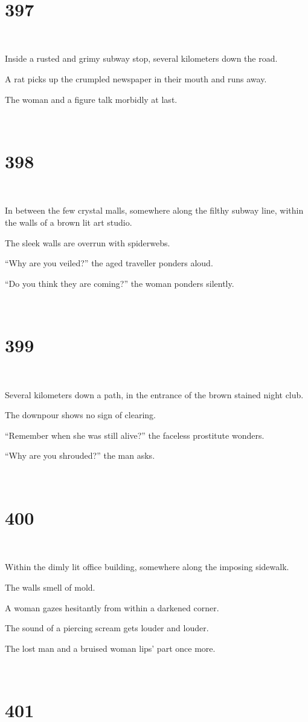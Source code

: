 \documentclass{report}
\begin{document}
~
\chapter*{397}
~

Inside a rusted and grimy subway stop, several kilometers down the road.

A rat picks up the crumpled newspaper in their mouth and runs away.

The woman and a figure talk morbidly at last.

~
\chapter*{398}
~

In between the few crystal malls, somewhere along the filthy subway line, within the walls of a brown lit art studio.

The sleek walls are overrun with spiderwebs.

``Why are you veiled?'' the aged traveller ponders aloud.

``Do you think they are coming?'' the woman ponders silently.

~
\chapter*{399}
~

Several kilometers down a path, in the entrance of the brown stained night club.

The downpour shows no sign of clearing.

``Remember when she was still alive?'' the faceless prostitute wonders.

``Why are you shrouded?'' the man asks.

~
\chapter*{400}
~

Within the dimly lit office building, somewhere along the imposing sidewalk.

The walls smell of mold.

A woman gazes hesitantly from within a darkened corner.

The sound of a piercing scream gets louder and louder.

The lost man and a bruised woman lips' part once more.

~
\chapter*{401}
~
\end{document}
